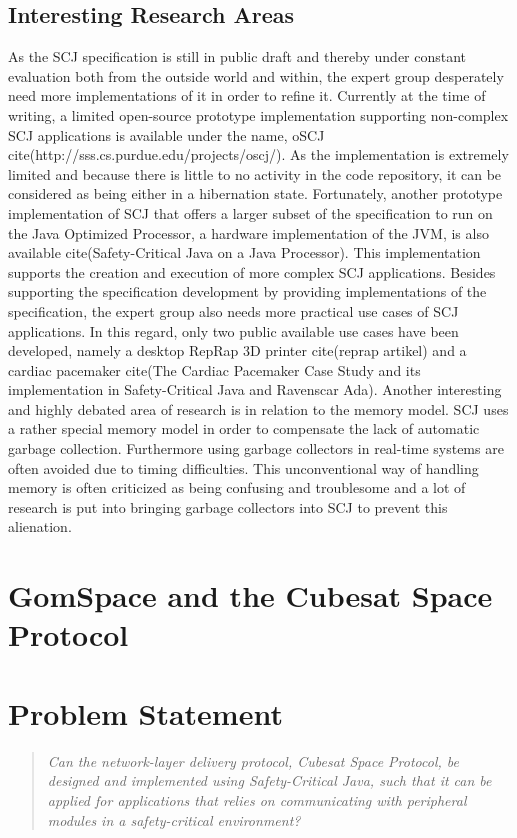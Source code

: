 

\subsection{Interesting Research Areas} %
\label{sub:interestingresearch}
As the SCJ specification is still in public draft and thereby under constant evaluation both from the outside world and within, the expert group desperately need more implementations of it in order to refine it. Currently at the time of writing, a limited open-source prototype implementation supporting non-complex SCJ applications is available under the name, oSCJ cite(http://sss.cs.purdue.edu/projects/oscj/). As the implementation is extremely limited and because there is little to no activity in the code repository, it can be considered as being either in a hibernation state. Fortunately, another prototype implementation of SCJ that offers a larger subset of the specification to run on the Java Optimized Processor, a hardware implementation of the JVM, is also available cite(Safety-Critical Java on a Java Processor). This implementation supports the creation and execution of more complex SCJ applications. Besides supporting the specification development by providing implementations of the specification, the expert group also needs more practical use cases of SCJ applications. In this regard, only two public available use cases have been developed, namely a desktop RepRap 3D printer cite(reprap artikel) and a cardiac pacemaker cite(The Cardiac Pacemaker Case Study and its implementation in Safety-Critical Java and Ravenscar Ada). Another interesting and highly debated area of research is in relation to the memory model. SCJ uses a rather special memory model in order to compensate the lack of automatic garbage collection. Furthermore using garbage collectors in real-time systems are often avoided due to timing difficulties. This unconventional way of handling memory is often criticized as being confusing and troublesome and a lot of research is put into bringing garbage collectors into SCJ to prevent this alienation.

\section{GomSpace and the Cubesat Space Protocol} %
\label{sec:gomspace_and_the_cubesat_space_protocol}


\section{Problem Statement} %
\label{sec:problem_statement}

\begin{quotation}
	\textit{Can the network-layer delivery protocol, Cubesat Space Protocol, be designed and implemented using Safety-Critical Java, such that it can be applied for applications that relies on communicating with peripheral modules in a safety-critical environment?}
\end{quotation}
